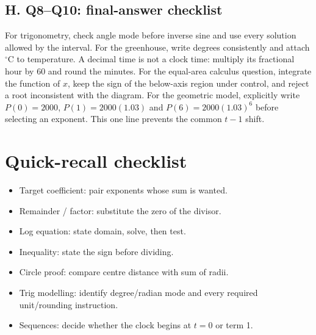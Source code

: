 \documentclass[10pt,a4paper]{article}
\begin{document}
\subsection*{H. Q8--Q10: final-answer checklist}
For trigonometry, check angle mode before inverse sine and use every solution allowed by the interval. For the greenhouse, write degrees consistently and attach $^\circ\mathrm C$ to temperature. A decimal time is not a clock time: multiply its fractional hour by 60 and round the minutes. For the equal-area calculus question, integrate the function of $x$, keep the sign of the below-axis region under control, and reject a root inconsistent with the diagram. For the geometric model, explicitly write $P(0)=2000$, $P(1)=2000(1.03)$ and $P(6)=2000(1.03)^6$ before selecting an exponent. This one line prevents the common $t-1$ shift.
\section*{Quick-recall checklist}\begin{itemize}[leftmargin=*]\item Target coefficient: pair exponents whose sum is wanted.\item Remainder / factor: substitute the zero of the divisor.\item Log equation: state domain, solve, then test.\item Inequality: state the sign before dividing.\item Circle proof: compare centre distance with sum of radii.\item Trig modelling: identify degree/radian mode and every required unit/rounding instruction.\item Sequences: decide whether the clock begins at $t=0$ or term 1.\end{itemize}
\end{document}
